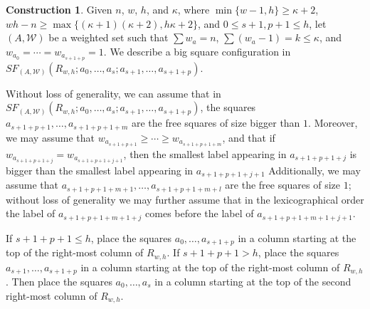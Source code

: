 \documentclass[pagebackref,colorlinks,citecolor=blue,linkcolor=blue,urlcolor=blue,filecolor=blue]{article}
\theoremstyle{definition}\newtheorem{definition}[thm]{Definition}
\theoremstyle{definition}
\newtheorem{const}[thm]{Construction}
\begin{document}
\begin{const}\label{first construction for connectivity}
Given $n$, $w$, $h$, and $\kappa$, where $\min\{w-1,h\}\ge \kappa+2$, $wh-n\ge \max\big\{(\kappa+1)(\kappa+2), h\kappa+2\big\}$,
 and $0\le s+1, p+1\le h$,
let $(A, \mathcal{W})$ be a weighted set such that $\sum w_{a}=n$, $\sum(w_{a}-1)=k\le \kappa$, and $w_{a_{0}}=\cdots=w_{a_{s+1+p}}=1$.
We describe a big square configuration in $SF_{(A, \mathcal{W})}(R_{w, h}; a_{0},\dots, a_{s}; a_{s+1},\dots, a_{s+1+p})$.

Without loss of generality, we can assume that in $SF_{(A, \mathcal{W})}(R_{w, h}; a_{0},\dots, a_{s}; a_{s+1},\dots, a_{s+1+p})$, the squares $a_{s+1+p+1},\dots, a_{s+1+p+1+m}$ are the free squares of size bigger than $1$.
Moreover, we may assume that $w_{a_{s+1+p+1}}\ge\cdots\ge w_{a_{s+1+p+1+m}}$, and that if $w_{a_{s+1+p+1+j}}=w_{a_{s+1+p+1+j+1}}$, then the smallest label appearing in $a_{s+1+p+1+j}$ is bigger than the smallest label appearing in $a_{s+1+p+1+j+1}$
Additionally, we may assume that $a_{s+1+p+1+m+1},\dots, a_{s+1+p+1+m+l}$ are the free squares of size $1$; without loss of generality we may further assume that in the lexicographical order the label of $a_{s+1+p+1+m+1+j}$ comes before the label of $a_{s+1+p+1+m+1+j+1}$.

If $s+1+p+1\le h$, place the squares $a_{0},\dots, a_{s+1+p}$ in a column starting at the top of the right-most column of $R_{w,h}$.
If $s+1+p+1>h$, place the squares $a_{s+1}, \dots, a_{s+1+p}$ in a column starting at the top of the right-most column of $R_{w,h}$.
Then place the squares $a_{0}, \dots, a_{s}$ in a column starting at the top of the second right-most column of $R_{w,h}$.


\end{const}
\end{document}
